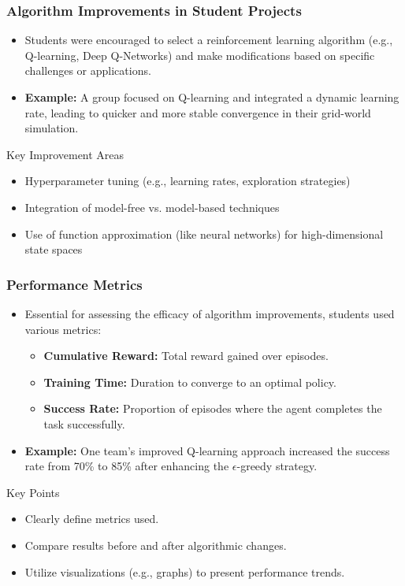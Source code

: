 \documentclass[aspectratio=169]{beamer}
\begin{document}
\begin{frame}[fragile]
    \frametitle{Algorithm Improvements in Student Projects}
    \begin{itemize}
        \item Students were encouraged to select a reinforcement learning algorithm (e.g., Q-learning, Deep Q-Networks) and make modifications based on specific challenges or applications.
        \item \textbf{Example:} A group focused on Q-learning and integrated a dynamic learning rate, leading to quicker and more stable convergence in their grid-world simulation.
    \end{itemize}
    
    \begin{block}{Key Improvement Areas}
        \begin{itemize}
            \item Hyperparameter tuning (e.g., learning rates, exploration strategies)
            \item Integration of model-free vs. model-based techniques
            \item Use of function approximation (like neural networks) for high-dimensional state spaces
        \end{itemize}
    \end{block}
\end{frame}

\begin{frame}[fragile]
    \frametitle{Performance Metrics}
    \begin{itemize}
        \item Essential for assessing the efficacy of algorithm improvements, students used various metrics:
        \begin{itemize}
            \item \textbf{Cumulative Reward:} Total reward gained over episodes.
            \item \textbf{Training Time:} Duration to converge to an optimal policy.
            \item \textbf{Success Rate:} Proportion of episodes where the agent completes the task successfully.
        \end{itemize}
        \item \textbf{Example:} One team's improved Q-learning approach increased the success rate from 70\% to 85\% after enhancing the $\epsilon$-greedy strategy.
    \end{itemize}
    
    \begin{block}{Key Points}
        \begin{itemize}
            \item Clearly define metrics used.
            \item Compare results before and after algorithmic changes.
            \item Utilize visualizations (e.g., graphs) to present performance trends.
        \end{itemize}
    \end{block}
\end{frame}
\end{document}
